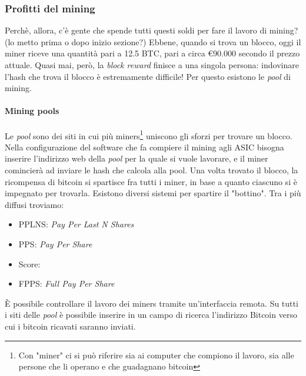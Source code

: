 \documentclass {article}
\begin{document}
\subsubsection {Profitti del mining}


Perchè, allora, c'è gente che spende tutti questi soldi per fare il lavoro di mining? (lo metto prima o dopo inizio sezione?)
Ebbene, quando si trova un blocco, oggi il miner riceve una quantità pari a 12.5 BTC, pari a circa \euro{90.000} secondo il prezzo attuale.
Quasi mai, però, la \textit{block reward} finisce a una singola persona: indovinare l'hash che trova il blocco è estremamente difficile!
Per questo esistono le \textit{pool} di mining.

\paragraph {Mining pools}

Le \textit{pool} sono dei siti in cui più miners\footnote{Con "miner" ci si può riferire sia ai computer che compiono il lavoro, sia alle persone che li operano e che guadagnano bitcoin} uniscono gli sforzi per trovare un blocco.
Nella configurazione del software che fa compiere il mining agli ASIC bisogna inserire l'indirizzo web della \textit{pool} per la quale si vuole lavorare, e il miner comincierà ad inviare le hash che calcola alla pool.
Una volta trovato il blocco, la ricompensa di bitcoin si spartisce fra tutti i miner, in base a quanto ciascuno si è impegnato per trovarla.
Esistono diversi sistemi per spartire il "bottino". Tra i più diffusi troviamo:

\begin{itemize}
\item PPLNS: \textit{Pay Per Last N Shares}
\item PPS: \textit{Pay Per Share} 
\item Score:
\item FPPS: \textit{Full Pay Per Share}
\end{itemize}
%
È possibile controllare il lavoro dei miners tramite un'interfaccia remota. Su tutti i siti delle \textit{pool} è possibile inserire in un campo di ricerca l'indirizzo Bitcoin verso cui i bitcoin ricavati saranno inviati.
\end{document}
